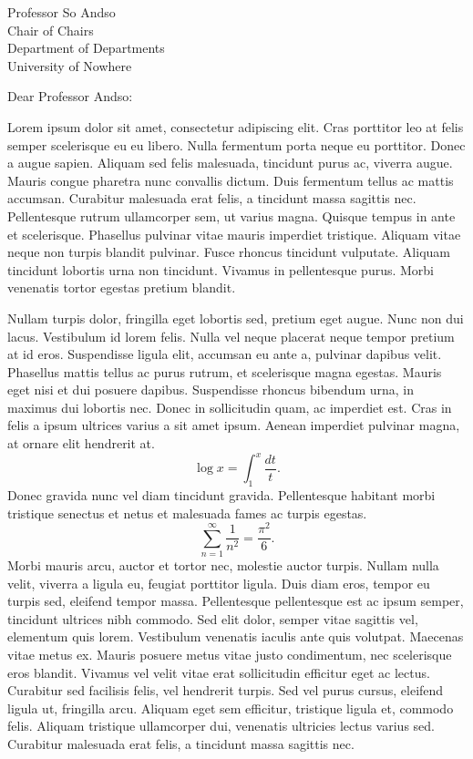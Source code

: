 \documentclass[letterpaper]{mscsletter2015}
\begin{document}
\begin{letter}{
Professor So Andso\\
Chair of Chairs\\
Department of Departments\\
University of Nowhere\\
}

\opening{Dear Professor Andso:}

Lorem ipsum dolor sit amet, consectetur adipiscing elit. Cras
porttitor leo at felis semper scelerisque eu eu libero. Nulla
fermentum porta neque eu porttitor. Donec a augue sapien. Aliquam sed
felis malesuada, tincidunt purus ac, viverra augue. Mauris congue
pharetra nunc convallis dictum. Duis fermentum tellus ac mattis
accumsan. Curabitur malesuada erat felis, a tincidunt massa sagittis
nec. Pellentesque rutrum ullamcorper sem, ut varius magna. Quisque
tempus in ante et scelerisque. Phasellus pulvinar vitae mauris
imperdiet tristique. Aliquam vitae neque non turpis blandit
pulvinar. Fusce rhoncus tincidunt vulputate. Aliquam tincidunt
lobortis urna non tincidunt. Vivamus in pellentesque purus. Morbi
venenatis tortor egestas pretium blandit.

Nullam turpis dolor, fringilla eget lobortis sed, pretium eget
augue. Nunc non dui lacus. Vestibulum id lorem felis. Nulla vel neque
placerat neque tempor pretium at id eros. Suspendisse ligula elit,
accumsan eu ante a, pulvinar dapibus velit. Phasellus mattis tellus ac
purus rutrum, et scelerisque magna egestas. Mauris eget nisi et dui
posuere dapibus. Suspendisse rhoncus bibendum urna, in maximus dui
lobortis nec. Donec in sollicitudin quam, ac imperdiet est. Cras in
felis a ipsum ultrices varius a sit amet ipsum. Aenean imperdiet
pulvinar magna, at ornare elit hendrerit at.
$$\log x = \int_1^x\frac{dt}{t}.$$
Donec gravida nunc vel diam tincidunt gravida. Pellentesque habitant
morbi tristique senectus et netus et malesuada fames ac turpis
egestas.
$$\sum_{n=1}^\infty\frac{1}{n^2} = \frac{\pi^2}{6}.$$
Morbi mauris arcu, auctor et tortor nec, molestie auctor
turpis. Nullam nulla velit, viverra a ligula eu, feugiat porttitor
ligula. Duis diam eros, tempor eu turpis sed, eleifend tempor
massa. Pellentesque pellentesque est ac ipsum semper, tincidunt
ultrices nibh commodo. Sed elit dolor, semper vitae sagittis vel,
elementum quis lorem. Vestibulum venenatis iaculis ante quis
volutpat. Maecenas vitae metus ex. Mauris posuere metus vitae justo
condimentum, nec scelerisque eros blandit. Vivamus vel velit vitae
erat sollicitudin efficitur eget ac lectus. Curabitur sed facilisis
felis, vel hendrerit turpis. Sed vel purus cursus, eleifend ligula ut,
fringilla arcu. Aliquam eget sem efficitur, tristique ligula et,
commodo felis. Aliquam tristique ullamcorper dui, venenatis ultricies
lectus varius sed. Curabitur malesuada erat felis, a tincidunt massa sagittis
nec.


\end{letter}
\end{document}
